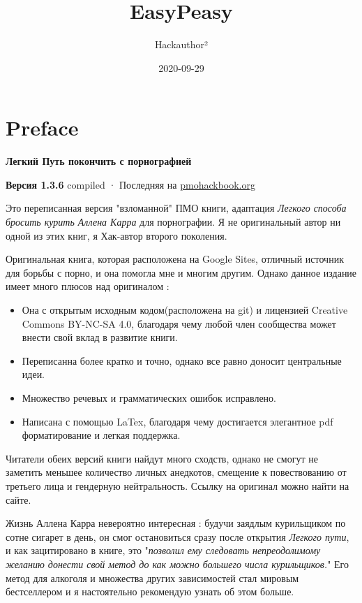 \documentclass[
]{book}
\title{EasyPeasy}
\author{Hackauthor²}
\date{2020-09-29}
\begin{document}
\maketitle

{
\setcounter{tocdepth}{1}
\tableofcontents
}
\hypertarget{preface}{%
\chapter*{Preface}\label{preface}}

\textbf{Легкий Путь покончить с порнографией}

\textbf{Версия 1.3.6} compiled · Последняя на \href{https://pmohackbook.org}{pmohackbook.org}

Это переписанная версия "взломанной" ПМО книги, адаптация \emph{Легкого способа бросить курить Аллена Карра} для порнографии. Я не оригинальный автор ни одной из этих книг, я Хак-автор второго поколения.

Оригинальная книга, которая расположена на Google Sites, отличный источник для борьбы с порно, и она помогла мне и многим другим. Однако данное издание имеет много плюсов над оригиналом :

\begin{itemize}
\item
  Она с открытым исходным кодом(расположена на git) и лицензией Creative Commons BY-NC-SA 4.0, благодаря чему любой член сообщества может внести свой вклад в развитие книги.
\item
  Переписанна более кратко и точно, однако все равно доносит центральные идеи.
\item
  Множество речевых и грамматических ошибок исправлено.
\item
  Написана с помощью LaTex, благодаря чему достигается элегантное pdf форматирование и легкая поддержка.
\end{itemize}

Читатели обеих версий книги найдут много сходств, однако не смогут не заметить меньшее количество личных анедкотов, смещение к повествованию от третьего лица и гендерную нейтральность. Ссылку на оригинал можно найти на сайте.

Жизнь Аллена Карра невероятно интересная : будучи заядлым курильщиком по сотне сигарет в день, он смог остановиться сразу после открытия \emph{Легкого пути}, и как зацитировано в книге, это "\emph{позволил ему следовать непреодолимому желанию донести свой метод до как можно большего числа курильщиков.}" Его метод для алкоголя и множества других зависимостей стал мировым бестселлером и я настоятельно рекомендую узнать об этом больше.
\end{document}
